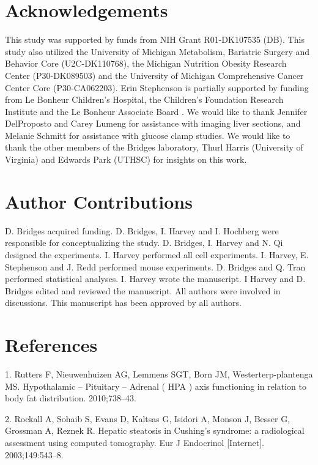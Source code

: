 \documentclass[11pt]{article} %
\begin{document}
\section*{Acknowledgements}\label{acknowledgements}

This study was supported by funds from NIH Grant R01-DK107535 (DB). This
study also utilized the University of Michigan Metabolism, Bariatric
Surgery and Behavior Core (U2C-DK110768), the Michigan Nutrition Obesity
Research Center (P30-DK089503) and the University of Michigan
Comprehensive Cancer Center Core (P30-CA062203). Erin Stephenson is
partially supported by funding from Le Bonheur Children's Hospital, the
Children's Foundation Research Institute and the Le Bonheur Associate
Board . We would like to thank Jennifer DelProposto and Carey Lumeng for
assistance with imaging liver sections, and Melanie Schmitt for
assistance with glucose clamp studies. We would like to thank the other
members of the Bridges laboratory, Thurl Harris (University of Virginia)
and Edwards Park (UTHSC) for insights on this work.

\section*{Author Contributions}
D. Bridges acquired funding. D. Bridges, I. Harvey and I. Hochberg were responsible for conceptualizing the study. D. Bridges, I. Harvey and N. Qi designed the experiments. I. Harvey performed all cell experiments. I. Harvey, E. Stephenson and J. Redd performed mouse experiments. D. Bridges and Q. Tran performed statistical analyses. I. Harvey wrote the manuscript. I Harvey and D. Bridges edited and reviewed the manuscript. All authors were involved in discussions. This manuscript has been approved by all authors.

\section*{References}\label{references}

1. Rutters F, Nieuwenhuizen AG, Lemmens SGT, Born JM,
Westerterp-plantenga MS. Hypothalamic -- Pituitary -- Adrenal ( HPA )
axis functioning in relation to body fat distribution. 2010;738--43.

2. Rockall A, Sohaib S, Evans D, Kaltsas G, Isidori A, Monson J, Besser
G, Grossman A, Reznek R. Hepatic steatosis in Cushing's syndrome: a
radiological assessment using computed tomography. Eur J Endocrinol
{[}Internet{]}. 2003;149:543--8. 
\end{document}
